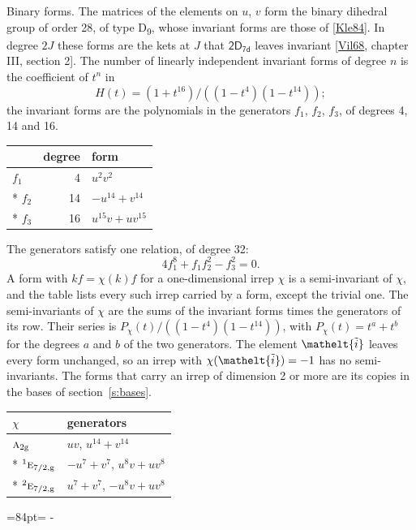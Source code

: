 \documentclass[10pt,a4paper]{article}
\makeatletter
\renewcommand\paragraph{\@startsection{paragraph}{4}{\z@}{1.5ex plus .5ex minus .2ex}{-1em}%
  {\normalfont\small\sffamily\bfseries\color{parttitle}}}
\newcommand{\needspace}[1]{\par\penalty-100\begingroup\dimen0=#1\relax\dimen2=\pagegoal
  \advance\dimen2-\pagetotal\ifdim\dimen0>\dimen2\relax\ifdim\dimen2>0pt\vfil\break\fi\fi
  \endgroup}
\numberwithin{equation}{section}
\newcommand{\eltfont}[1]{{\let\sigma\eltsigma\mathelt{#1}}}
\newcommand{\grp}[1]{\mathsf{#1}}
\newcommand{\irr}[1]{\text{\normalfont\scshape #1}}
\newcommand{\conjpair}[1]{{}^{#1}}
\newcommand{\elt}[1]{\eltfont{#1}}
\newcommand{\ptag}[1]{\mathrm{#1}}
\newcommand{\lift}[1]{\tilde{#1}}
\makeatother
\begin{document}
\paragraph{Binary forms.}
The matrices of the elements on $u$, $v$ form the binary dihedral group of order 28, of type D\textsubscript{9}, whose invariant forms are those of [\href{../../../REFERENCES.pdf\#ref.Kle84}{Kle84}]. In degree $2J$ these forms are the kets at $J$ that $\grp{2D_{7d}}$ leaves invariant [\href{../../../REFERENCES.pdf\#ref.Vil68}{Vil68}, chapter III, section 2]. \label{n:head.degree}\label{n:head.form}The number of linearly independent invariant forms of degree $n$ is the coefficient of $t^n$ in
\begin{equation}\label{e:molien}H(t) = (1 + t^{16})/((1-t^{4})(1-t^{14}));\end{equation}
the invariant forms are the polynomials in the generators $f_1$, $f_2$, $f_3$, of degrees 4, 14 and 16.
{\small\begin{longtable}{@{}lrl@{}}\toprule
& degree & form\\\midrule\endhead
\bottomrule\endfoot\endlastfoot
$f_{1}$ & 4 & $u^{2}v^{2}$\\*
$f_{2}$ & 14 & $-u^{14} + v^{14}$\\*
$f_{3}$ & 16 & $u^{15}v + uv^{15}$\\
\bottomrule\end{longtable}}
The generators satisfy one relation, of degree 32:
\begin{equation}\label{e:relation}4f_{1}^{8} + f_{1}f_{2}^{2} - f_{3}^{2} = 0.\end{equation}
A form with $k f = \chi(k) f$ for a one-dimensional irrep $\chi$ is a semi-invariant of $\chi$, and the table lists every such irrep carried by a form, except the trivial one. \label{n:head.generators}The semi-invariants of $\chi$ are the sums of the invariant forms times the generators of its row. Their series is $P_\chi(t)/((1-t^{4})(1-t^{14}))$, with $P_\chi(t) = t^{a} + t^{b}$ for the degrees $a$ and $b$ of the two generators. The element $\elt{\lift{i}}$ leaves every form unchanged, so an irrep with $\chi(\elt{\lift{i}}) = -1$ has no semi-invariants. The forms that carry an irrep of dimension 2 or more are its copies in the bases of section~\ref{s:bases}.
{\small\begin{longtable}{@{}ll@{}}\toprule
$\chi$ & generators\\\midrule\endhead
\bottomrule\endfoot\endlastfoot
$\irr{a}_{2\ptag{g}}$ & $uv$, $u^{14} + v^{14}$\\*
$\conjpair{1}\irr{e}_{7/2,\ptag{g}}$ & $-u^{7} + v^{7}$, $u^{8}v + uv^{8}$\\*
$\conjpair{2}\irr{e}_{7/2,\ptag{g}}$ & $u^{7} + v^{7}$, $-u^{8}v + uv^{8}$\\
\bottomrule\end{longtable}}
\needspace{84pt}
\end{document}
